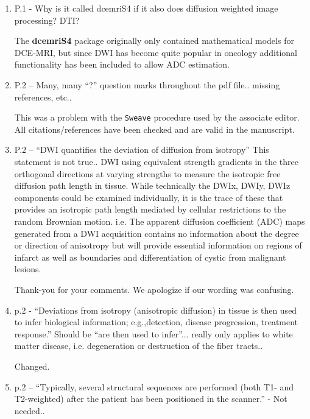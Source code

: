 \documentclass[11pt]{article}
\begin{document}
\begin{enumerate}

\item P.1 - Why is it called dcemriS4 if it also does diffusion
  weighted image processing? DTI?

  The \textbf{dcemriS4} package originally only contained
  mathematical models for DCE-MRI, but since DWI has become quite
  popular in oncology additional functionality has been included to
  allow ADC estimation.  

\item P.2 – Many, many ``?'' question marks throughout the pdf
  file.. missing references, etc..

  This was a problem with the \texttt{Sweave} procedure used by the
  associate editor.  All citations/references have been checked and
  are valid in the manuscript.

\item P.2 – ``DWI quantifies the deviation of diffusion from
  isotropy'' This statement is not true..  DWI using equivalent
  strength gradients in the three orthogonal directions at varying
  strengths to measure the isotropic free diffusion path length in
  tissue. While technically the DWIx, DWIy, DWIz components could be
  examined individually, it is the trace of these that provides an
  isotropic path length mediated by cellular restrictions to the
  random Brownian motion.  i.e. The apparent diffusion coefficient
  (ADC) maps generated from a DWI acquisition contains no information
  about the degree or direction of anisotropy but will provide
  essential information on regions of infarct as well as boundaries
  and differentiation of cystic from malignant lesions.

  Thank-you for your comments.  We apologize if our wording was
  confusing.

\item p.2 - ``Deviations from isotropy (anisotropic diffusion) in
  tissue is then used to infer biological information; e.g.,detection,
  disease progression, treatment response.''  Should be ``are then
  used to infer''... really only applies to white matter disease, i.e.
  degeneration or destruction of the fiber tracts..

  Changed.

\item p.2 – ``Typically, several structural sequences are performed
  (both T1- and T2-weighted) after the patient has been positioned in
  the scanner.'' - Not needed..


\end{enumerate}
\end{document}
